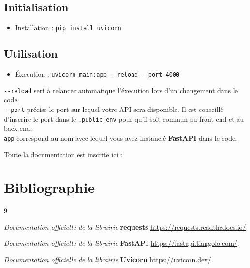 \documentclass[12pt]{article}
\begin{document}
\subsection{Initialisation}
\begin{itemize}
    \item Installation : \texttt{pip install uvicorn}
\end{itemize}

\subsection{Utilisation}
\begin{itemize}
    \item Éxecution : \texttt{uvicorn main:app -{}-reload -{}-port 4000}
\end{itemize}
\texttt{-{}-reload} sert à relancer automatique l'éxecution lors d'un changement dans le code.
\\\texttt{-{}-port} précise le port sur lequel votre API sera disponible. Il est conseillé d'inscrire le port dans le \texttt{.public\_env} pour qu'il soit commun au front-end et au back-end. 
\\\texttt{app} correspond au nom avec lequel vous avez instancié \textbf{FastAPI} dans le code.

\par Toute la documentation est inscrite ici : \cite{uvicornDoc}

\section{Bibliographie}
\begin{thebibliography}{9}

\textit{Documentation officielle de la librairie} \textbf{requests}
\url{https://requests.readthedocs.io/}

\textit{Documentation officielle de la librairie} \textbf{FastAPI}
\url{https://fastapi.tiangolo.com/}.

\textit{Documentation officielle de la librairie} \textbf{Uvicorn}
\url{https://uvicorn.dev/}.

\end{thebibliography}
\end{document}
